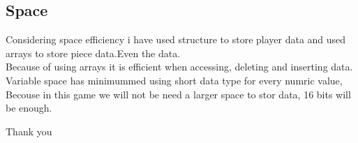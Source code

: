 \documentclass{article}
\begin{document}
\subsection{Space}
Considering space efficiency i have used structure to store player data and used arrays to store piece data.Even the data.\\
Because of using arrays it is efficient when accessing, deleting and inserting data.\\
Variable space has minimummed using short data type for every numric value, Becouse in this game we will not be need a larger space to stor data, 16 bits will be enough.

\newpage %

\thispagestyle{empty} %
\begin{center}
    \vspace*{\fill}
    {Thank you}
    \vspace*{\fill}
\end{center}
\end{document}
